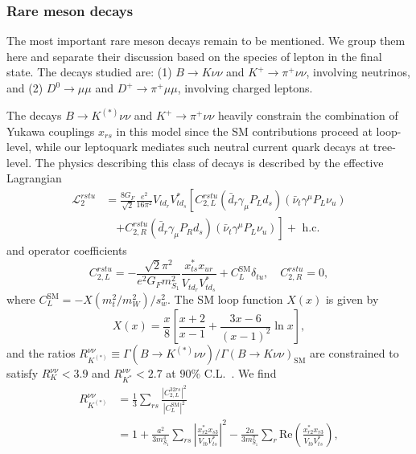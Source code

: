\subsubsection{Rare meson decays}
\label{sec:ch3-raremesondecays}

The most important rare meson decays remain to be mentioned. We group them here
and separate their discussion based on the species of lepton in the final state.
The decays studied are: (1) $B \to K \nu \nu$ and $K^+ \to \pi^+ \nu \nu$,
involving neutrinos, and (2) $D^0 \to \mu \mu$ and $D^+ \to \pi^+ \mu \mu$,
involving charged leptons.

The decays $B \rightarrow K^{(*)} \nu \nu$ and $K^+ \rightarrow \pi^+ \nu \nu$ heavily
constrain the combination of Yukawa couplings $x_{rs}$ in this model since the
SM contributions proceed at loop-level, while our leptoquark mediates such
neutral current quark decays at tree-level. The physics describing this class of
decays is described by the effective Lagrangian~\cite{Altmannshofer:2009ma,
  Buras:2004uu}
\begin{equation}
  \begin{split}
    \mathscr{L}_2^{rstu}
    &= \frac{8 G_F}{\sqrt{2}} \frac{e^2}{16 \pi^2} V_{t d_r} V^*_{t d_s} \left[ C^{rstu}_{2,L} (\bar{d}_r \gamma_\mu P_{L} d_s)(\bar{\nu}_t
      \gamma^\mu P_L \nu_u) \right. \\ &\quad \left. + C^{rstu}_{2,R} (\bar{d}_r \gamma_\mu P_{R} d_s)(\bar{\nu}_t
      \gamma^\mu P_L \nu_u) \right] + \text{ h.c.}
  \end{split}
\end{equation}
and operator coefficients
\begin{equation}
  C_{2,L}^{rstu} = -\frac{\sqrt{2}\pi^2}{e^2 G_F m_{S_{1}}^2}\frac{x^*_{t s} x_{u r}}{V_{t d_r}V_{t d_s}^*} + C_L^{\text{SM}}\delta_{tu}, \quad C_{2,R}^{rstu} = 0,
\end{equation}
where $C_L^{\text{SM}} = -X(m_t^2/m_W^2)/s_w^2$. The SM loop function $X(x)$ is
given by~\cite{Buras:2004uu, Altmannshofer:2009ma, Buchalla:1998ba,
  Misiak:1999yg}
\begin{equation}
  X(x) = \frac{x}{8} \left[ \frac{x+2}{x-1} + \frac{3x-6}{(x-1)^2} \ln x \right],
\end{equation}
and the ratios
$R_{K^{(*)}}^{\nu\nu} \equiv \Gamma(B\rightarrow K^{(*)} \nu \nu)/\Gamma(B\rightarrow K \nu \nu)_{\text{SM}}$
are constrained to satisfy $R_K^{\nu\nu} < 3.9$ and $R_{K^{*}}^{\nu\nu} < 2.7$
at $90\%$ C.L.~\cite{Grygier:2017tzo}. We find
\begin{equation} \label{eq:ch3-rknunu}
  \begin{split}
    R_{K^{(*)}}^{\nu\nu} &= \frac{1}{3}\sum_{rs}\frac{|C_{2,L}^{32rs} |^2 }{|C_L^{\text{SM}}|^2}\\
    &= 1 + \frac{a^2}{3m_{S_{1}}^4}\sum_{rs}\left|\frac{x^*_{r 2} x_{s 3}}{V_{tb}
        V^*_{ts}}\right|^2 - \frac{2a}{3m_{S_{1}}^2} \sum_r \text{Re} \left(\frac{x^*_{r
        2} x_{r 3}}{V_{tb} V^*_{ts}}\right),
  \end{split}
\end{equation}
